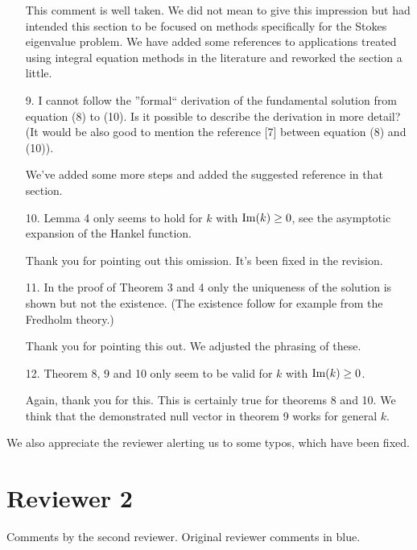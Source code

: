 \documentclass{article}
\begin{document}
\begin{itemize}
  This comment is well taken.
  We did not mean to give this impression but had intended this section
  to be focused on methods specifically for the Stokes eigenvalue problem.
  We have added some references to applications treated using integral
  equation methods in the literature and reworked the section
  a little.

\item[9.] {\color{blue}
  I cannot follow the ”formal“ derivation of the fundamental solution from
  equation (8) to (10). Is it possible to describe the derivation in more
  detail? (It would be also good to mention the reference [7] between
  equation (8) and (10)).}

  We've added some more steps and added the suggested
  reference in that section.

\item[10.] {\color{blue}
  Lemma 4 only seems to hold for $k$ with ${\rm Im}(k) \geq 0$,
  see the asymptotic expansion of the Hankel function.}

  Thank you for pointing out this omission. It's been fixed
  in the revision.

\item[11.] {\color{blue} In the proof of Theorem 3 and 4 only the
  uniqueness of the solution is shown but not the existence.
  (The existence follow for example from the Fredholm theory.)}

  Thank you for pointing this out. We adjusted the
  phrasing of these.

\item[12.] {\color{blue}
  Theorem 8, 9 and 10 only seem to be valid for $k$ with
  ${\rm Im}(k) \geq 0$.}

  Again, thank you for this. This is certainly true for theorems
  8 and 10. We think that the demonstrated null vector in
  theorem 9 works for general $k$.

\end{itemize}

We also appreciate the reviewer alerting us to some typos, which have
been fixed.

\section{Reviewer 2}


Comments by the second reviewer. Original reviewer comments
in {\color{blue} blue}.
\end{document}
